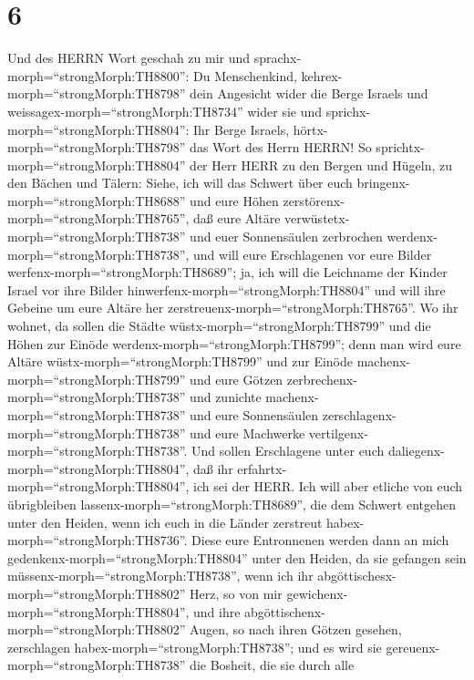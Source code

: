 \hypertarget{section-5}{%
\section{6}\label{section-5}}

 Und des HERRN Wort geschah zu mir und
sprachx-morph=``strongMorph:TH8800'':  Du Menschenkind,
kehrex-morph=``strongMorph:TH8798'' dein Angesicht wider die Berge
Israels und weissagex-morph=``strongMorph:TH8734'' wider sie
 und sprichx-morph=``strongMorph:TH8804'': Ihr Berge
Israels, hörtx-morph=``strongMorph:TH8798'' das Wort des Herrn HERRN! So
sprichtx-morph=``strongMorph:TH8804'' der Herr HERR zu den Bergen und
Hügeln, zu den Bächen und Tälern: Siehe, ich will das Schwert über euch
bringenx-morph=``strongMorph:TH8688'' und eure Höhen
zerstörenx-morph=``strongMorph:TH8765'',  daß eure Altäre
verwüstetx-morph=``strongMorph:TH8738'' und euer Sonnensäulen zerbrochen
werdenx-morph=``strongMorph:TH8738'', und will eure Erschlagenen vor
eure Bilder werfenx-morph=``strongMorph:TH8689'';  ja, ich
will die Leichname der Kinder Israel vor ihre Bilder
hinwerfenx-morph=``strongMorph:TH8804'' und will ihre Gebeine um eure
Altäre her zerstreuenx-morph=``strongMorph:TH8765''.  Wo ihr
wohnet, da sollen die Städte wüstx-morph=``strongMorph:TH8799'' und die
Höhen zur Einöde werdenx-morph=``strongMorph:TH8799''; denn man wird
eure Altäre wüstx-morph=``strongMorph:TH8799'' und zur Einöde
machenx-morph=``strongMorph:TH8799'' und eure Götzen
zerbrechenx-morph=``strongMorph:TH8738'' und zunichte
machenx-morph=``strongMorph:TH8738'' und eure Sonnensäulen
zerschlagenx-morph=``strongMorph:TH8738'' und eure Machwerke
vertilgenx-morph=``strongMorph:TH8738''.  Und sollen
Erschlagene unter euch daliegenx-morph=``strongMorph:TH8804'', daß ihr
erfahrtx-morph=``strongMorph:TH8804'', ich sei der HERR. 
Ich will aber etliche von euch übrigbleiben
lassenx-morph=``strongMorph:TH8689'', die dem Schwert entgehen unter den
Heiden, wenn ich euch in die Länder zerstreut
habex-morph=``strongMorph:TH8736''.  Diese eure Entronnenen
werden dann an mich gedenkenx-morph=``strongMorph:TH8804'' unter den
Heiden, da sie gefangen sein müssenx-morph=``strongMorph:TH8738'', wenn
ich ihr abgöttischesx-morph=``strongMorph:TH8802'' Herz, so von mir
gewichenx-morph=``strongMorph:TH8804'', und ihre
abgöttischenx-morph=``strongMorph:TH8802'' Augen, so nach ihren Götzen
gesehen, zerschlagen habex-morph=``strongMorph:TH8738''; und es wird sie
gereuenx-morph=``strongMorph:TH8738'' die Bosheit, die sie durch alle
